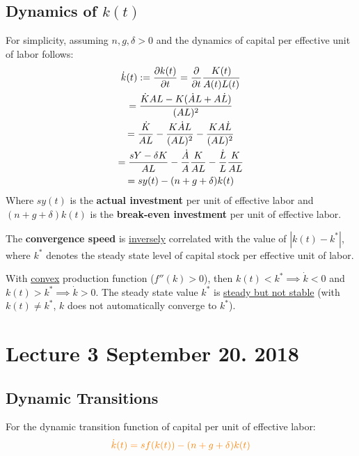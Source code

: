 \documentclass[]{article}
\begin{document}
			\subsection{Dynamics of $k(t)$}
				\par For simplicity, assuming $n, g, \delta > 0$ and the dynamics of capital per effective unit of labor follows: 
				\begin{gather*}
					\dot{k}(t) := \frac{\partial{k(t)}}{\partial{t}} = \frac{\partial{}}{\partial{t}} \frac{K(t)}{A(t)L(t)} \\
					= \frac{\dot{K}AL - K(\dot{A}L + A\dot{L})}{(AL)^2} \\
					= \frac{\dot{K}}{AL} - \frac{K\dot{A}L}{(AL)^2} - \frac{K A\dot{L}}{(AL)^2} \\
					= \frac{sY - \delta K}{AL} - \frac{\dot{A}}{A}\frac{K}{AL} - \frac{\dot{L}}{L} \frac{K}{AL} \\
					= sy(t) - (n + g + \delta) k(t)
				\end{gather*}
				Where $s y(t)$ is the \textbf{actual investment} per unit of effective labor and $(n + g + \delta) k(t)$ is the \textbf{break-even investment} per unit of effective labor.
				
			\begin{remark}
				The \textbf{convergence speed} is \ul{inversely} correlated with the value of $| k(t) - k^* |$, where $k^*$ denotes the steady state level of capital stock per effective unit of labor.
			\end{remark}
			
			\begin{remark}
				With \ul{convex} production function ($f''(k) > 0$), then $k(t) < k^* \implies \dot{k} < 0$ and $k(t) > k^* \implies \dot{k} > 0$. The steady state value $k^*$ is \ul{steady but not stable} (with $k(t) \neq k^*$, $k$ does not automatically converge to $k^*$).
			\end{remark}
	
	\section{Lecture 3 September 20. 2018}
		\subsection{Dynamic Transitions}
			\begin{remark}
				For the dynamic transition function of capital per unit of effective labor:
				\begin{equation}
				\textcolor{orange}{
					\dot{k}(t) = sf(k(t)) - (n+g+\delta)k(t)
					}
				\end{equation}
			\end{remark}
\end{document}
